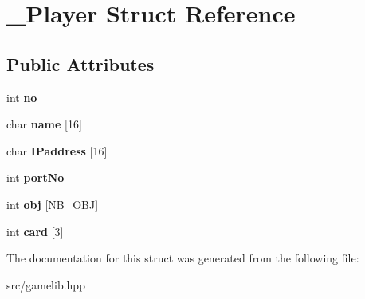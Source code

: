 \hypertarget{struct___player}{}\section{\+\_\+\+Player Struct Reference}
\label{struct___player}
\subsection*{Public Attributes}
\begin{DoxyCompactItemize}
\item 
int {\bfseries no}\hypertarget{struct___player_a962d40b7ae74f37b92caffdd783a12ee}{}\label{struct___player_a962d40b7ae74f37b92caffdd783a12ee}

\item 
char {\bfseries name} \mbox{[}16\mbox{]}\hypertarget{struct___player_a9a87b96be77fbbac4a6fcd0606994a9c}{}\label{struct___player_a9a87b96be77fbbac4a6fcd0606994a9c}

\item 
char {\bfseries I\+Paddress} \mbox{[}16\mbox{]}\hypertarget{struct___player_ab2080f24e414abb071699955f8901c9b}{}\label{struct___player_ab2080f24e414abb071699955f8901c9b}

\item 
int {\bfseries port\+No}\hypertarget{struct___player_aca73f3888d3a1f70320603b8af81ac62}{}\label{struct___player_aca73f3888d3a1f70320603b8af81ac62}

\item 
int {\bfseries obj} \mbox{[}N\+B\+\_\+\+O\+BJ\mbox{]}\hypertarget{struct___player_abb9d194d90baed848f51eebfca8903c9}{}\label{struct___player_abb9d194d90baed848f51eebfca8903c9}

\item 
int {\bfseries card} \mbox{[}3\mbox{]}\hypertarget{struct___player_a0709887e5a2bf3e6ebb0b3f23e51dcf0}{}\label{struct___player_a0709887e5a2bf3e6ebb0b3f23e51dcf0}

\end{DoxyCompactItemize}


The documentation for this struct was generated from the following file\+:\begin{DoxyCompactItemize}
\item 
src/gamelib.\+hpp\end{DoxyCompactItemize}

